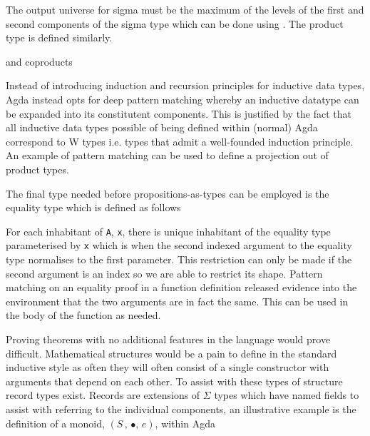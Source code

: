 
The output universe for sigma must be the maximum of the levels of the first and
second components of the sigma type which can be done using . The
product type is defined similarly.


and coproducts


Instead of introducing induction and recursion principles for inductive data
types, Agda instead opts for deep pattern matching whereby an inductive datatype
can be expanded into its constitutent components. This is justified by the fact
that all inductive data types possible of being defined within (normal) Agda
correspond to W types i.e. types that admit a well-founded induction principle.
An example of pattern matching can be used to define a projection out of product
types.



The final type needed before propositions-as-types can be employed is the
equality type which is defined as follows


For each inhabitant of \verb|A|, \verb|x|, there is unique inhabitant of the
equality type parameterised by \verb|x| which is when the second indexed
argument to the equality type normalises to the first parameter. This
restriction can only be made if the second argument is an index so we are able
to restrict its shape. Pattern matching on an equality proof in a function
definition released evidence into the environment that the two arguments are in
fact the same. This can be used in the body of the function as needed.

Proving theorems with no additional features in the language would prove
difficult. Mathematical structures would be a pain to define in the standard
inductive style as often they will often consist of a single constructor with
arguments that depend on each other. To assist with these types of structure
record types exist. Records are extensions of $\Sigma$ types which have named
fields to assist with referring to the individual components, an illustrative
example is the definition of a monoid, $(S \, , \, \bullet , \, e)$, within Agda

